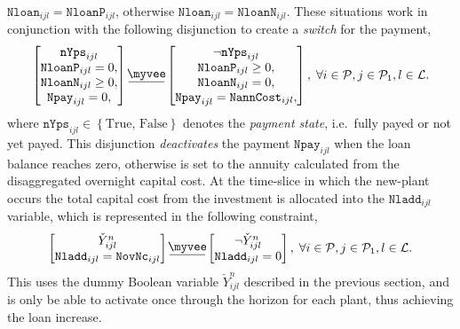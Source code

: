 \documentclass{amsart}
\newcommand{\myveebar}{\mathbin{\vcenter{\hbox{$ \underline{\mkern-2.4mu{\myvee}\mkern-2.4mu} $}}}}
\begin{document}
$\mathtt{Nloan}_{ijl} = \mathtt{NloanP}_{ijl}$, otherwise 
$\mathtt{Nloan}_{ijl} = \mathtt{NloanN}_{ijl}$. These situations work in
conjunction with the following disjunction to create a \emph{switch} for the
payment,
%
\begin{equation}
    \begin{bmatrix}
        \mathtt{nYps}_{ijl} \\
        \mathtt{NloanP}_{ijl} = 0, \\
        \mathtt{NloanN}_{ijl} \geq 0,\\
        \mathtt{Npay}_{ijl} = 0, \\
    \end{bmatrix}
    \myveebar
    \begin{bmatrix}
        \neg \mathtt{nYps}_{ijl} \\
        \mathtt{NloanP}_{ijl} \geq 0, \\
        \mathtt{NloanN}_{ijl} = 0, \\
        \mathtt{Npay}_{ijl} = \mathtt{NannCost}_{ijl}, \\
    \end{bmatrix}
    , \; \forall i\in \mathcal{P}, j\in \mathcal{P}_1, l\in \mathcal{L}.
\end{equation}
%
where $\mathtt{nYps}_{ijl} \in \left\{\text{True, False}\right\}$ denotes the
\emph{payment state}, i.e.\ fully payed or not yet payed. This disjunction
\emph{deactivates} the payment $\mathtt{Npay}_{ijl}$ when the loan balance
reaches zero, otherwise is set to the annuity calculated from the disaggregated 
overnight capital cost. 
%
At the time-slice in which the new-plant occurs the total capital cost from the
investment is allocated into the $\mathtt{Nladd}_{ijl}$ variable, which is
represented in the following constraint,
%
\begin{equation}
    \begin{bmatrix}
        \check{Y}^n_{ijl} \\
        \mathtt{Nladd}_{ijl} = \mathtt{NovNc}_{ijl}
    \end{bmatrix}
    \myveebar
    \begin{bmatrix}
        \neg \check{Y}^n_{ijl} \\
        \mathtt{Nladd}_{ijl} = 0
    \end{bmatrix}
    , \; \forall i\in \mathcal{P}, j\in \mathcal{P}_1, l\in \mathcal{L}.
\end{equation}
%
This uses the dummy Boolean variable $\check{Y}^n_{ijl}$ described in the
previous section, and is only be able to activate once through the horizon for
each plant, thus achieving the loan increase.
\end{document}
